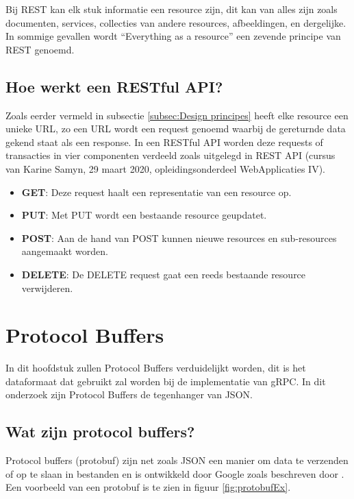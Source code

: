 Bij REST kan elk stuk informatie een resource zijn, dit kan van alles zijn zoals documenten, services, collecties van andere resources, afbeeldingen, en dergelijke. In sommige gevallen wordt “Everything as a resource”  een zevende principe van REST genoemd. 

\subsection{Hoe werkt een RESTful API?}
\label{subsec:Hoe werkt een RESTful API?}

Zoals eerder vermeld in subsectie \ref{subsec:Design principes} heeft elke resource een unieke URL, zo een URL wordt een request genoemd waarbij de gereturnde data gekend staat als een response. In een RESTful API worden deze requests of transacties in vier componenten verdeeld zoals uitgelegd in REST API (cursus van Karine Samyn, 29 maart 2020, opleidingsonderdeel WebApplicaties IV).

\begin{itemize}
    \item \textbf{GET}: Deze request haalt een representatie van een resource op.
    \item \textbf{PUT}: Met PUT wordt een bestaande resource geupdatet.
    \item \textbf{POST}: Aan de hand van POST kunnen nieuwe resources en sub-resources aangemaakt worden.
    \item \textbf{DELETE}: De DELETE request gaat een reeds bestaande resource verwijderen.
\end{itemize}

\section{Protocol Buffers}
\label{sec:Protocol Buffers}

 In dit hoofdstuk zullen Protocol Buffers verduidelijkt worden, dit is het dataformaat dat gebruikt zal worden bij de implementatie van gRPC. In dit onderzoek zijn Protocol Buffers de tegenhanger van JSON.

\subsection{Wat zijn protocol buffers?}
\label{subsec:Wat zijn protocol buffers?}

Protocol buffers (protobuf) zijn net zoals JSON een manier om data te verzenden of op te slaan in bestanden en is ontwikkeld door Google zoals beschreven door \textcite{Kurian2020}. Een voorbeeld van een protobuf is te zien in figuur \ref{fig:protobufEx}.

